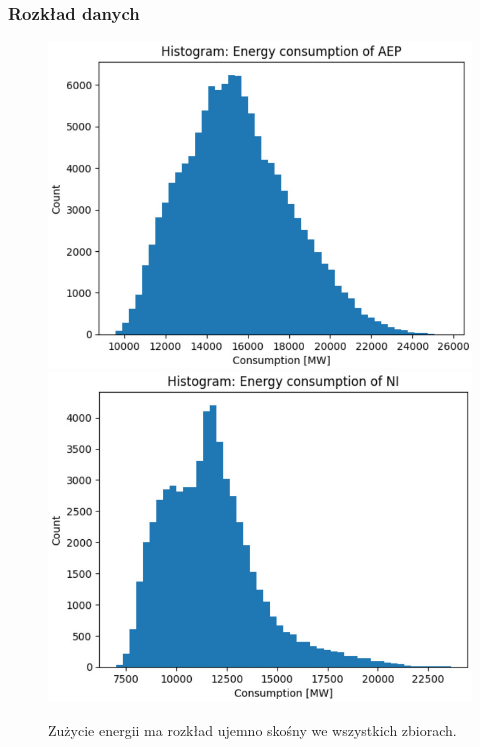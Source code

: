 \documentclass[]{beamer}
\begin{document}
\begin{frame}
  \frametitle{Rozkład danych}

  \begin{figure}
    \centering
    \begin{multicols}{2}
      \includegraphics[width=1.0\linewidth]{histogram_1.jpg}
      \includegraphics[width=1.0\linewidth]{histogram_2.jpg}
    \end{multicols}
    \caption{
      Zużycie energii ma rozkład ujemno skośny we wszystkich zbiorach.
    }
  \end{figure}

\end{frame}
\end{document}
